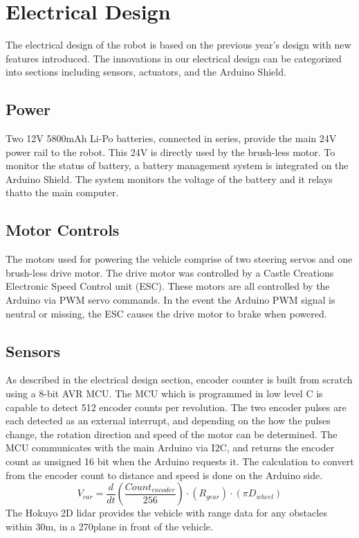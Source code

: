 \documentclass[11pt,journal]{IEEEtran}
\begin{document}
\section{Electrical Design}
The electrical design of the robot is based on the previous year’s design with new features introduced. The innovations in our electrical design can be categorized into sections including sensors, actuators, and the Arduino Shield.

\subsection{Power}
Two 12V 5800mAh Li-Po batteries, connected in series, provide the main 24V power rail to the robot. This 24V is directly used by the brush-less motor. To monitor the status of battery, a battery management system is integrated on the Arduino Shield. The system monitors the voltage of the battery and it relays thatto the main computer.

\subsection{Motor Controls}
The motors used for powering the vehicle comprise of two steering servos and one brush-less drive motor. The drive motor was controlled by a Castle Creations Electronic Speed Control unit (ESC). These motors are all controlled by the Arduino via PWM servo commands. In the event the Arduino PWM signal is neutral or missing, the ESC causes the drive motor to brake when powered.

\subsection{Sensors}
As described in the electrical design section, encoder counter is built from scratch using a 8-bit AVR MCU. The MCU which is programmed in low level C is capable to detect 512 encoder counts per revolution. The two encoder pulses are each detected as an external interrupt, and depending on the how the pulses change, the rotation direction and speed of the motor can be determined. The MCU communicates with the main Arduino via I2C, and returns the encoder count as unsigned 16 bit when the Arduino requests it. The calculation to convert from the encoder count to distance and speed is done on the Arduino side.
\begin{equation}
    V_{car} = \frac{d}{dt}(\frac{Count_{encoder}}{256})\cdot(R_{gear})\cdot(\pi D_{wheel})
\end{equation}
The Hokuyo 2D lidar provides the vehicle with range data for any obstacles within 30m, in a 270\degree plane in front of the vehicle.
\end{document}

